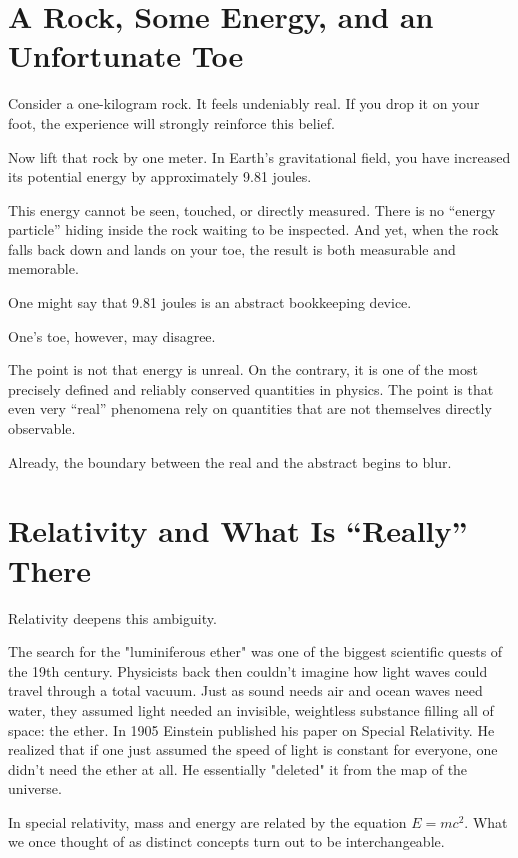 \section{A Rock, Some Energy, and an Unfortunate Toe}

Consider a one-kilogram rock. It feels undeniably real. If you drop it on your foot, the experience will strongly reinforce this belief.

Now lift that rock by one meter. In Earth's gravitational field, you have increased its potential energy by approximately 9.81 joules.

This energy cannot be seen, touched, or directly measured. There is no ``energy particle'' hiding inside the rock waiting to be inspected.
And yet, when the rock falls back down and lands on your toe, the result is both measurable and memorable.

One might say that 9.81 joules is an abstract bookkeeping device.

One's toe, however, may disagree.

The point is not that energy is unreal. On the contrary, it is one of the most precisely defined and reliably conserved quantities in physics.
The point is that even very ``real'' phenomena rely on quantities that are not themselves directly observable.

Already, the boundary between the real and the abstract begins to blur.


\section{Relativity and What Is ``Really'' There}

Relativity deepens this ambiguity.

The search for the "luminiferous ether" was one of the biggest scientific quests of the 19th century. Physicists back then couldn't imagine how light waves could travel through a total vacuum.
Just as sound needs air and ocean waves need water, they assumed light needed an invisible, weightless substance filling all of space: the ether.
In 1905 Einstein published his paper on Special Relativity. He realized that if one just assumed the speed of light is constant for everyone, one didn't need the ether at all.
He essentially "deleted" it from the map of the universe.

In special relativity, mass and energy are related by the equation \( E = mc^2 \). What we once thought of as distinct concepts turn out to be interchangeable.

